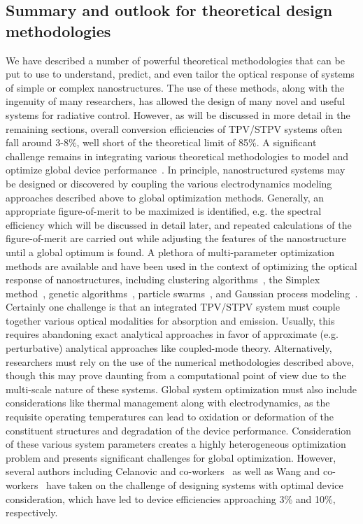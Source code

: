 \documentclass[10pt,letterpaper]{article}
\begin{document}
{\subsection{Summary and outlook for theoretical design methodologies}
We have described a number of powerful theoretical methodologies that can be put to use to understand, predict, and even tailor the optical
response of systems of simple or complex nanostructures.  The use of these methods, along with the ingenuity of many researchers, has
allowed the design of many novel and useful systems for radiative control.  However, as will be discussed in more detail in the remaining sections, 
overall conversion efficiencies of TPV/STPV systems often fall around 3-8\%,  well short of the theoretical limit of 85\%.  A significant challenge remains in integrating
various theoretical methodologies to model and optimize global device performance~\cite{g4,g9}.
In principle, nanostructured systems may be designed or discovered by coupling the various electrodynamics modeling approaches described above 
to global optimization methods.  Generally, an appropriate figure-of-merit to be maximized is identified, e.g. the spectral efficiency which will
be discussed in detail later, and repeated calculations of the figure-of-merit are carried out while adjusting the features of the nanostructure until 
a global optimum is found.  A plethora of multi-parameter optimization methods are available and have been used in the context of optimizing the 
optical response of nanostructures, including clustering algorithms~\cite{g4}, the Simplex method~\cite{Simplex, CH_APL_2006}, genetic algorithms~\cite{ga,DB_JApplPhys_2007}, 
particle swarms~\cite{NDJ_JApplPhys_2012, ParticleSwarm}, and Gaussian
process modeling~\cite{miller1}.  Certainly one
challenge is that an integrated TPV/STPV system must couple together various optical modalities for absorption and emission.  Usually, this requires
abandoning exact analytical approaches in favor of approximate (e.g. perturbative) analytical approaches like coupled-mode theory.  Alternatively,
researchers must rely on the use of the numerical methodologies described above, 
though this may
prove daunting from a computational point of view due to the multi-scale nature of these systems.
Global system optimization must also include considerations like thermal management along with electrodynamics, as the
requisite operating temperatures can lead to oxidation or deformation of the
constituent structures and degradation of the device performance.  
Consideration of these various system parameters creates a highly heterogeneous optimization problem
and presents significant challenges for global optimization.  
However, several authors including Celanovic and co-workers~\cite{g4}
as well as Wang and co-workers~\cite{g9} have taken on the challenge of designing systems with optimal device consideration, which have led to device efficiencies approaching 3\% and 
10\%, respectively. 
  
}
\end{document}
